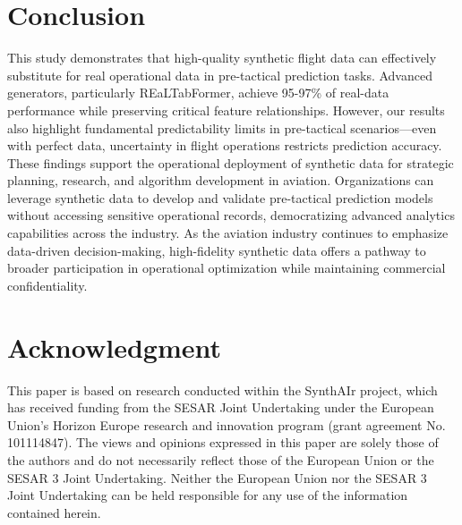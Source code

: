 \documentclass[conference]{IEEEtran}
\begin{document}
\section{Conclusion}

This study demonstrates that high-quality synthetic flight data can effectively substitute for real operational data in pre-tactical prediction tasks. Advanced generators, particularly REaLTabFormer, achieve 95-97\% of real-data performance while preserving critical feature relationships. However, our results also highlight fundamental predictability limits in pre-tactical scenarios—even with perfect data, uncertainty in flight operations restricts prediction accuracy.
These findings support the operational deployment of synthetic data for strategic planning, research, and algorithm development in aviation. Organizations can leverage synthetic data to develop and validate pre-tactical prediction models without accessing sensitive operational records, democratizing advanced analytics capabilities across the industry. As the aviation industry continues to emphasize data-driven decision-making, high-fidelity synthetic data offers a pathway to broader participation in operational optimization while maintaining commercial confidentiality.


\section*{Acknowledgment}

This paper is based on research conducted within the SynthAIr project, which has received funding from the SESAR Joint Undertaking under the European Union’s Horizon Europe research and innovation program (grant agreement No. 101114847). The views and opinions expressed in this paper are solely those of the authors and do not necessarily reflect those of the European Union or the SESAR 3 Joint Undertaking. Neither the European Union nor the SESAR 3 Joint Undertaking can be held responsible for any use of the information contained herein.


\balance



\end{document}
